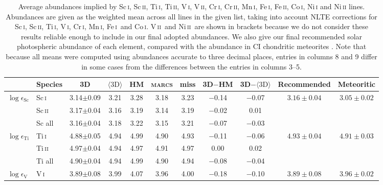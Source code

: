 \documentclass[traditabstract]{aa}
\newcommand{\ph}{\phantom{$-$}}
\newcommand{\oneDAV}{$\langle\mathrm{3D}\rangle$}
\newcommand{\altsci}{Sc\,\textsc{i}}
\newcommand{\altscii}{Sc\,\textsc{ii}}
\newcommand{\alttii}{Ti\,\textsc{i}}
\newcommand{\altvi}{V\,\textsc{i}}
\newcommand{\altvii}{V\,\textsc{ii}}
\newcommand{\altcri}{Cr\,\textsc{i}}
\newcommand{\altmni}{Mn\,\textsc{i}}
\newcommand{\altfei}{Fe\,\textsc{i}}
\newcommand{\altcoi}{Co\,\textsc{i}}
\newcommand{\altniii}{Ni\,\textsc{ii}}
\newcommand{\vii}{\altvii\ }
\newcommand{\fei}{\altfei\ }
\newcommand{\niii}{\altniii\ }
\begin{document}
\begin{table}[tbp]
\centering
\caption[Abundances implied by all lines]{Average abundances implied by Sc\,\textsc{i}, Sc\,\textsc{ii}, Ti\,\textsc{i}, Ti\,\textsc{ii}, V\,\textsc{i}, V\,\textsc{ii}, Cr\,\textsc{i}, Cr\,\textsc{ii}, Mn\,\textsc{i}, Fe\,\textsc{i}, Fe\,\textsc{ii}, Co\,\textsc{i}, Ni\,\textsc{i} and Ni\,\textsc{ii} lines.  Abundances are given as the weighted mean across all lines in the given list, taking into account NLTE corrections for \altsci, \altscii, \alttii, \altvi, \altcri, \altmni, \fei and \altcoi.  \vii and \niii are shown in brackets because we do not consider these results reliable enough to include in our final adopted abundances.  We also give our final recommended solar photospheric abundance of each element, compared with the abundance in CI chondritic meteorites \protect\citep[][normalised to the silicon abundance determined in \protect{}]{Lodders09}.  Note that because all means were computed using abundances accurate to three decimal places, entries in columns 8 and 9 differ in some cases from the differences between the entries in columns 3--5.}
\label{table:abuns}
\begin{tabular}{l l c c c c c c c c c}
\hline
\hline
& Species & 3D & \oneDAV & HM & \textsc{marcs} & {\sc miss} & 3D$-$HM & 3D$-$\oneDAV & Recommended & Meteoritic\\
\hline
$\log \epsilon_\mathrm{Sc}$     & Sc\,\textsc{i}    & 3.14$\pm$0.09 & 3.21 & 3.28 & 3.18 & 3.23 & $-$0.14 & $-$0.07 & $3.16\pm0.04$ & $3.05\pm0.02$\\
                                & Sc\,\textsc{ii}   & 3.17$\pm$0.04 & 3.16 & 3.19 & 3.14 & 3.19 & $-$0.02 & \ph0.01 & \\
                                & Sc all            & 3.16$\pm$0.04 & 3.18 & 3.22 & 3.15 & 3.21 & $-$0.07 & $-$0.03 & \vspace{1mm}\\
$\log \epsilon_\mathrm{Ti}$     & Ti\,\textsc{i}    & 4.88$\pm$0.05 & 4.94 & 4.99 & 4.90 & 4.93 & $-$0.11 & $-$0.06 & $4.93\pm0.04$ & $4.91\pm0.03$\\
                                & Ti\,\textsc{ii}   & 4.97$\pm$0.04 & 4.94 & 4.97 & 4.91 & 4.97 & \ph0.00 & \ph0.02 & \\
                                & Ti all            & 4.90$\pm$0.04 & 4.94 & 4.99 & 4.90 & 4.94 & $-$0.08 & $-$0.04 & \vspace{1mm}\\
$\log \epsilon_\mathrm{V}$      & V\,\textsc{i}     & 3.89$\pm$0.08 & 3.99 & 4.07 & 3.96 & 4.00 & $-$0.18 & $-$0.10 & $3.89\pm0.08$ & $3.96\pm0.02$\\

\end{tabular}
\end{table}
\end{document}
